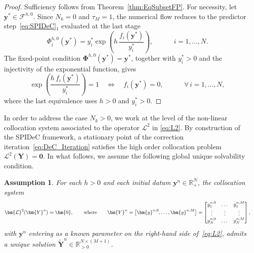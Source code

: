 \documentclass[a4paper,num-refs]{oup-contemporary-spidec}
\newtheorem{assumption}[theorem]{Assumption}
\begin{document}
\begin{proof}
    Sufficiency follows from Theorem~\ref{thm:EqSubsetFP}. For necessity, let
    $\bm{y}^*\in\mathcal{F}^{h,0}$. Since $N_k=0$ and $\tau_M=1$, the
    numerical flow reduces to the predictor step~\eqref{eq:SPIDeC}$_1$
    evaluated at the last stage
    \begin{equation*}
        \Phi_i^{h,0}(\bm{y}^*)
        = y_i^*\exp\!\left(h\,\frac{f_i(\bm{y}^*)}{y_i^*}\right),
        \qquad \quad i=1,\dots,N.
    \end{equation*}
    The fixed-point condition $\bm{\Phi}^{h,0}(\bm{y}^*)=\bm{y}^*$, together
    with $y_i^*>0$ and the injectivity of the exponential function, gives
    \begin{equation*}
        \exp\!\left(\frac{h\,f_i(\bm{y}^*)}{y_i^*}\right)=1
        \quad\iff\quad
        f_i(\bm{y}^*)=0,
        \qquad \quad \forall\, i=1,\dots,N,
    \end{equation*}
    where the last equivalence uses $h>0$ and $y_i^*>0$.
\end{proof}

In order to address the case $N_k>0$, we work at the level of the non-linear collocation system associated to the operator $\bm{\mathcal{L}}^2$ in \eqref{eq:L2}. By construction of the SPIDeC framework, a stationary point of the correction iteration~\eqref{eq:DeC_Iteration}
satisfies the high order collocation problem
$\bm{\mathcal{L}}^2(\bm{Y})=\bm{0}$.
In what follows, we assume the following global unique solvability condition.
\begin{assumption}
\label{ass:Solv}
     For each $h>0$ and each initial datum $\bm{y}^n\in\mathbb{R}_{+}^{N}$, the collocation system
    \begin{equation}\label{eq:coll_syst_Con_L}
            \bm{\mathcal{L}}^2(\bm{Y}^n)=\bm{0},   \\
        \qquad \text{where} \qquad \bm{Y}^{n} =
        \big[ \bm{y}^{n,0},\dots,\bm{y}^{n,M} \big]=\begin{bmatrix}
        y_1^{n,0} & \dots & y_1^{n,M} \\
        \vdots & \vdots  & \vdots \\
        y_N^{n,0} & \dots & y_N^{n,M} \\ 
        \end{bmatrix},
    \end{equation}
    with $\bm{y}^n$ entering as a known parameter on the 
    right-hand side of~\eqref{eq:L2}, admits a unique 
    solution $\tilde{\bm{Y}}^n\in\mathbb{R}^{N\times(M+1)}_{>0}$.
\end{assumption}
\end{document}
